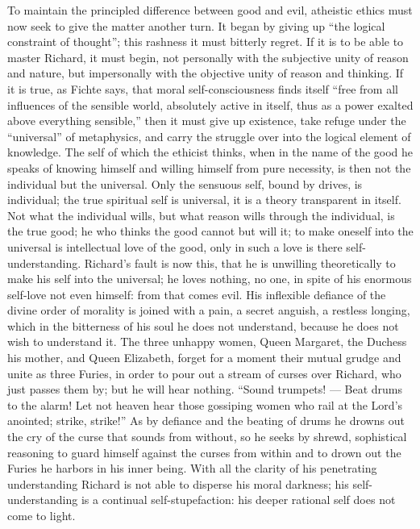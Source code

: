 \documentclass[12pt,a4paper,openany]{book}
\newcommand{\opage}[1]{\marginnote{\footnotesize\textit{[#1]}}}
\begin{document}
To maintain the principled difference between good
and evil, atheistic ethics must now seek to give the matter
another turn. It began by giving up
\setcounter{footnote}{0}%
\opage{539}``the logical constraint of thought''; this rashness it must
bitterly regret. If it is to be able to master Richard, it must
begin, not personally with the subjective unity of
reason and nature, but impersonally with the objective unity
of reason and thinking. If it is true, as Fichte
says, that moral self-consciousness finds itself ``free from
all influences of the sensible world, absolutely active in itself,
thus as a power exalted above everything sensible,''
then it must give up existence, take refuge under the
``universal'' of metaphysics, and carry the struggle over into the logical
element of knowledge. The self of which the ethicist thinks, when
in the name of the good he speaks of knowing himself and willing
himself from pure necessity, is then not the individual
but the universal. Only the sensuous self, bound by drives, is
individual; the true spiritual self is universal,
it is a theory transparent in itself. Not what the individual
wills, but what reason wills through the individual, is the true
good; he who thinks the good cannot but will
it; to make oneself into the universal is intellectual love
of the good, only in such a love is there self-understanding.
Richard's fault is now this, that he is unwilling theoretically
to make his self into the universal; he loves
nothing, no one, in spite of his enormous self-love not even
himself: from that comes evil. His inflexible
defiance of the divine order of morality is
joined with a pain, a secret anguish, a restless
longing, which in the bitterness of his soul he does not understand,
because he does not wish to understand it. The three unhappy women,
Queen Margaret, the Duchess his mother, and
Queen Elizabeth, forget for a moment their mutual
grudge and unite as three Furies, in order to
\setcounter{footnote}{0}%
\opage{540}pour out a stream of curses over Richard, who just
passes them by; but he will hear nothing. ``Sound
trumpets! --- Beat drums to the alarm! Let not heaven
hear those gossiping women who rail at the Lord's anointed;
strike, strike!'' As by defiance and the beating of drums he drowns out
the cry of the curse that sounds from without, so he seeks
by shrewd, sophistical reasoning to guard himself
against the curses from within and to drown out the Furies he
harbors in his inner being. With all the clarity of his penetrating
understanding Richard is not able to disperse his
moral darkness; his self-understanding is a continual self-stupefaction:
his deeper rational self does not come to
light.
\end{document}
